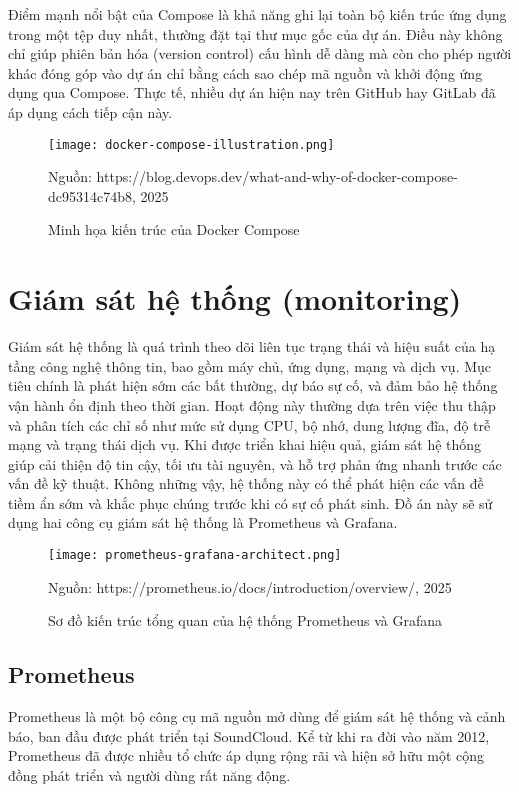 Điểm mạnh nổi bật của Compose là khả năng ghi lại toàn bộ kiến trúc ứng dụng trong một tệp duy nhất, thường đặt tại thư mục gốc của dự án. Điều này không chỉ giúp phiên bản hóa (version control) cấu hình dễ dàng mà còn cho phép người khác đóng góp vào dự án chỉ bằng cách sao chép mã nguồn và khởi động ứng dụng qua Compose. Thực tế, nhiều dự án hiện nay trên GitHub hay GitLab đã áp dụng cách tiếp cận này.

\begin{figure}[htbp]
    \centering
    \texttt{[image: docker-compose-illustration.png]}
    \caption{Minh họa kiến trúc của Docker Compose}
    \footnotesize{Nguồn: https://blog.devops.dev/what-and-why-of-docker-compose-dc95314c74b8, 2025}
\end{figure}

\section{Giám sát hệ thống (monitoring)}

Giám sát hệ thống là quá trình theo dõi liên tục trạng thái và hiệu suất của hạ tầng công nghệ thông tin, bao gồm máy chủ, ứng dụng, mạng và dịch vụ. Mục tiêu chính là phát hiện sớm các bất thường, dự báo sự cố, và đảm bảo hệ thống vận hành ổn định theo thời gian. Hoạt động này thường dựa trên việc thu thập và phân tích các chỉ số như mức sử dụng CPU, bộ nhớ, dung lượng đĩa, độ trễ mạng và trạng thái dịch vụ. Khi được triển khai hiệu quả, giám sát hệ thống giúp cải thiện độ tin cậy, tối ưu tài nguyên, và hỗ trợ phản ứng nhanh trước các vấn đề kỹ thuật. Không những vậy, hệ thống này có thể phát hiện các vấn đề tiềm ẩn sớm và khắc phục chúng trước khi có sự cố phát sinh. Đồ án này sẽ sử dụng hai công cụ giám sát hệ thống là Prometheus và Grafana.

\begin{figure}[htbp]
    \texttt{[image: prometheus-grafana-architect.png]}
    \caption{Sơ đồ kiến trúc tổng quan của hệ thống Prometheus và Grafana}
    \footnotesize{Nguồn: https://prometheus.io/docs/introduction/overview/, 2025}
\end{figure}

\subsection{Prometheus}

Prometheus \autocite{prometheus} là một bộ công cụ mã nguồn mở dùng để giám sát hệ thống và cảnh báo, ban đầu được phát triển tại SoundCloud. Kể từ khi ra đời vào năm 2012, Prometheus đã được nhiều tổ chức áp dụng rộng rãi và hiện sở hữu một cộng đồng phát triển và người dùng rất năng động.

